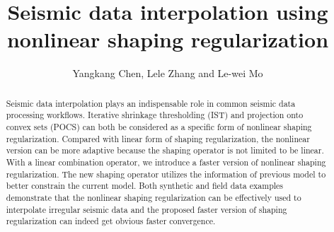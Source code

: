 \title{Seismic data interpolation using nonlinear shaping regularization}

\renewcommand{\thefootnote}{\fnsymbol{footnote}}
\author{Yangkang Chen\footnotemark[1], Lele Zhang \footnotemark[2] and Le-wei Mo \footnotemark[3]}

\address{
\footnotemark[1]Bureau of Economic Geology \\
John A. and Katherine G. Jackson School of Geosciences \\
The University of Texas at Austin \\
University Station, Box X \\
Austin, TX 78713-8924 \\

\footnotemark[2]
Institute of Geology and Geophysics, \\
Chinese Academy of Sciences,\\
Beijing, China, 102200 \\

\footnotemark[3]Research and Development Technology Group,
Fairfield Nodal, \\
1111 Gillingham Lane, \\
Sugar Land, TX 77478 \\
}



\begin{abstract}
Seismic data interpolation plays an indispensable role in common seismic data processing workflows. Iterative shrinkage thresholding (IST) and projection onto convex sets (POCS) can both be considered as a specific form of nonlinear shaping regularization. Compared with linear form of shaping regularization, the nonlinear version can be more adaptive because the shaping operator is not limited to be linear. With a linear combination operator, we introduce a faster version of nonlinear shaping regularization. The new shaping operator utilizes the information of previous model to better constrain the current model. Both synthetic and field data examples demonstrate that the nonlinear shaping regularization can be effectively used to interpolate irregular seismic data and the proposed faster version of shaping regularization can indeed get obvious faster convergence.
\end{abstract}

